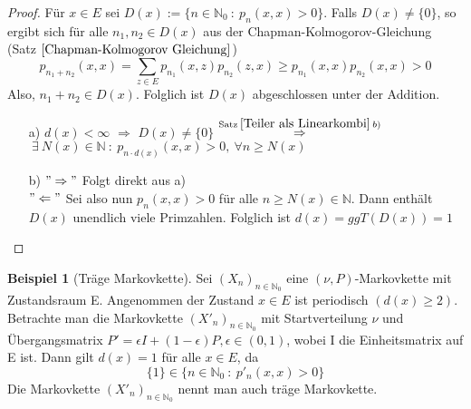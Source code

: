 \documentclass[a4paper,12pt]{scrartcl}
\theoremstyle{definition}
\newtheorem{bsp}{Beispiel}[section]
\begin{document}
\begin{proof}
Für $x \in E$ sei $D(x) := \lbrace n \in \mathbb{N}_{0} \: : \: p_{n}(x,x)>0 \rbrace$. Falls $D(x) \neq \lbrace 0 \rbrace$, so ergibt sich für alle $n_{1},n_{2} \in D(x)$ aus der Chapman-Kolmogorov-Gleichung (Satz $\ref{Chapman-Kolmogorov Gleichung}$)
\begin{equation*}
p_{n_{1} + n_{2}}(x,x) = \sum_{z \in E} p_{n_{1}}(x,z)p_{n_{2}}(z,x) \geq p_{n_{1}}(x,x)p_{n_{2}}(x,x) > 0 
\end{equation*}
Also, $n_{1} + n_{2} \in D(x)$. Folglich ist $D(x)$ abgeschlossen unter der Addition.
\begin{itemize}
\item[a)] $d(x) < \infty$ $\Rightarrow$ $D(x) \neq \lbrace 0 \rbrace$ $\stackrel{\mathrm{Satz} \: \ref{Teiler als Linearkombi} \: b)}{\Rightarrow}$ $\: \exists \: N(x) \in \mathbb{N} \: : \: p_{n \cdot d(x)}(x,x) > 0, \: \forall n \geq N(x)$
\item[b)] $"\Rightarrow"$ Folgt direkt aus a)
\\
$"\Leftarrow"$ Sei also nun $p_{n}(x,x)>0$ für alle $n \geq N(x) \in \mathbb{N}$. Dann enthält $D(x)$ unendlich viele Primzahlen. Folglich ist $d(x)=ggT(D(x))=1$
\end{itemize}
\end{proof}
\begin{bsp}[Träge Markovkette]
Sei $(X_{n})_{n \in \mathbb{N}_{0}}$ eine $(\nu,P)$-Markovkette mit Zustandsraum E. Angenommen der Zustand $x \in E$ ist periodisch $(d(x) \geq 2)$. Betrachte man die Markovkette $(X'_{n})_{n \in \mathbb{N}_{0}}$ mit Startverteilung $\nu$ und Übergangsmatrix $P' = \epsilon I + (1-\epsilon)P, \epsilon \in (0,1)$, wobei I die Einheitsmatrix auf E ist. Dann gilt $d(x)=1$ für alle $x \in E$, da
\begin{equation*}
\lbrace 1 \rbrace \in \lbrace n \in \mathbb{N}_{0} \: : \: p'_{n}(x,x)>0 \rbrace
\end{equation*}
Die Markovkette  $(X'_{n})_{n \in \mathbb{N}_{0}}$ nennt man auch träge Markovkette.
\end{bsp}
\end{document}
